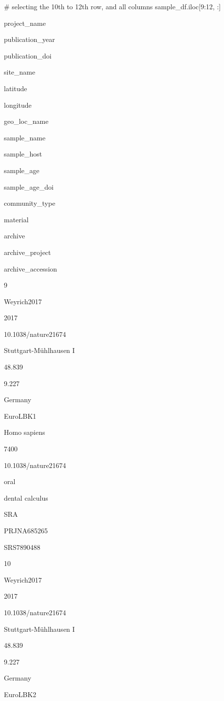 \documentclass[
  letterpaper,
]{book}
\newenvironment{Shaded}{}{}
\newcommand{\CommentTok}[1]{\textcolor[rgb]{0.42,0.45,0.49}{#1}}
\newcommand{\DecValTok}[1]{\textcolor[rgb]{0.00,0.36,0.77}{#1}}
\newcommand{\NormalTok}[1]{\textcolor[rgb]{0.14,0.16,0.18}{#1}}
\begin{document}
\begin{Shaded}
\begin{Highlighting}[]
\CommentTok{\# selecting the 10th to 12th row, and all columns}
\NormalTok{sample\_df.iloc[}\DecValTok{9}\NormalTok{:}\DecValTok{12}\NormalTok{, :]}
\end{Highlighting}
\end{Shaded}

project\_name

publication\_year

publication\_doi

site\_name

latitude

longitude

geo\_loc\_name

sample\_name

sample\_host

sample\_age

sample\_age\_doi

community\_type

material

archive

archive\_project

archive\_accession

9

Weyrich2017

2017

10.1038/nature21674

Stuttgart-Mühlhausen I

48.839

9.227

Germany

EuroLBK1

Homo sapiens

7400

10.1038/nature21674

oral

dental calculus

SRA

PRJNA685265

SRS7890488

10

Weyrich2017

2017

10.1038/nature21674

Stuttgart-Mühlhausen I

48.839

9.227

Germany

EuroLBK2
\end{document}
